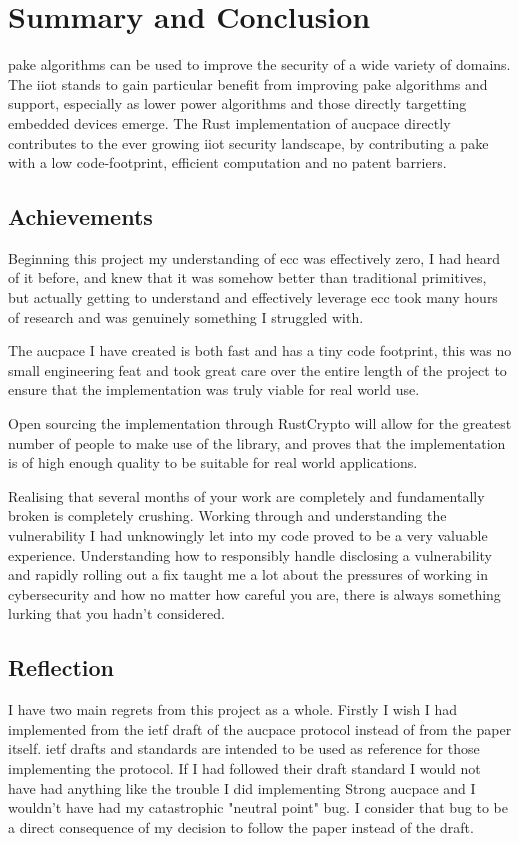 \chapter{Summary and Conclusion}
\label{chap:conclusion}

\gls{pake} algorithms can be used to improve the security of a wide variety of domains.
The \gls{iiot} stands to gain particular benefit from improving \gls{pake} algorithms and support, especially as lower power algorithms and those directly targetting embedded devices emerge.
The Rust implementation of \gls{aucpace} directly contributes to the ever growing \gls{iiot} security landscape, by contributing a \gls{pake} with a low code-footprint, efficient computation and no patent barriers.

\section{Achievements}
Beginning this project my understanding of \gls{ecc} was effectively zero, I had heard of it before, and knew that it was somehow better than traditional primitives, but actually getting to understand and effectively leverage \gls{ecc} took many hours of research and was genuinely something I struggled with.

The \gls{aucpace} I have created is both fast and has a tiny code footprint, this was no small engineering feat and took great care over the entire length of the project to ensure that the implementation was truly viable for real world use.

Open sourcing the implementation through RustCrypto will allow for the greatest number of people to make use of the library, and proves that the implementation is of high enough quality to be suitable for real world applications.

Realising that several months of your work are completely and fundamentally broken is completely crushing.
Working through and understanding the vulnerability I had unknowingly let into my code proved to be a very valuable experience.
Understanding how to responsibly handle disclosing a vulnerability and rapidly rolling out a fix taught me a lot about the pressures of working in cybersecurity and how no matter how careful you are, there is always something lurking that you hadn't considered.

\section{Reflection}
I have two main regrets from this project as a whole.
Firstly I wish I had implemented from the \gls{ietf} draft of the \gls{aucpace} protocol instead of from the paper itself.
\gls{ietf} drafts and standards are intended to be used as reference for those implementing the protocol.
If I had followed their draft standard I would not have had anything like the trouble I did implementing Strong \gls{aucpace} and I wouldn't have had my catastrophic "neutral point" bug.
I consider that bug to be a direct consequence of my decision to follow the paper instead of the draft.

